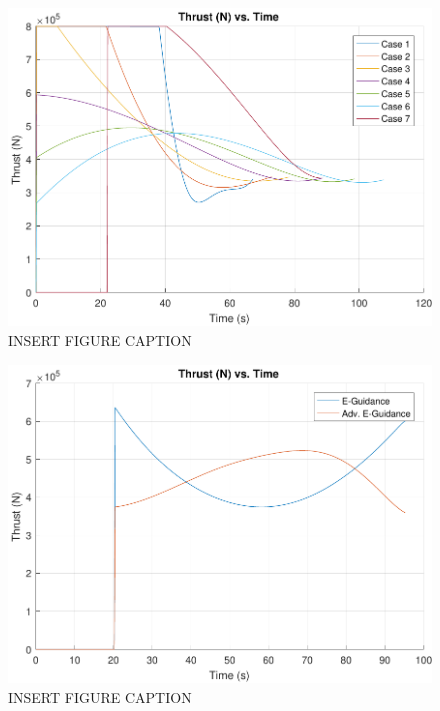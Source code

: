 \begin{figure}[H]
	\centering
	\begin{minipage}{4.5 in}
		\includegraphics[width=\linewidth]{Figures/thrpowvac.pdf}
		\caption{INSERT FIGURE CAPTION \label{fig:thrpowvac} }
	\end{minipage}
\end{figure}



\begin{figure}[H]
	\centering
	\begin{minipage}{4.5 in}
		\includegraphics[width=\linewidth]{Figures/thrsimvsadv.pdf}
		\caption{INSERT FIGURE CAPTION \label{fig:thrsimvsadv} }
	\end{minipage}
\end{figure}



